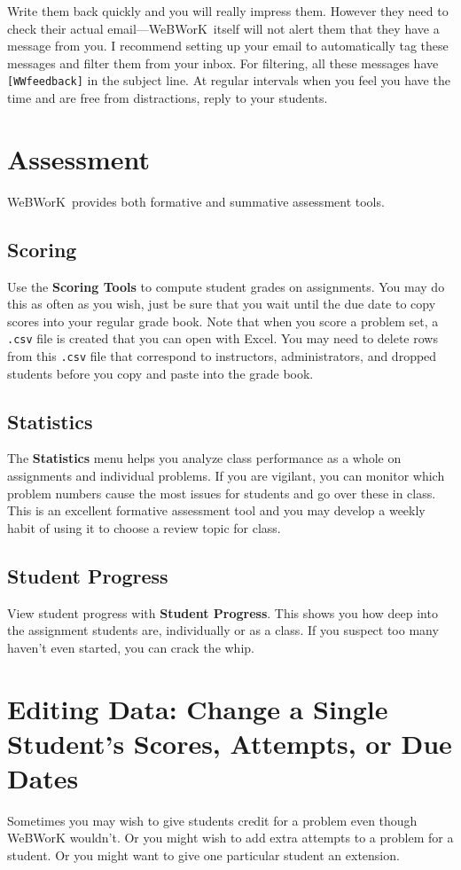 \documentclass[12pt]{article}
\newcommand{\menu}[1]{\textbf{#1}}
\newcommand{\WW}{WeBWorK}
\begin{document}
Write them back quickly and you will really impress them.
However they need to check their actual email---\WW\ itself will not alert them that they have a message from you.
I recommend setting up your email to automatically tag these messages and filter them from your inbox.
For filtering, all these messages have \texttt{[WWfeedback]} in the subject line.
At regular intervals when you feel you have the time and are free from distractions, reply to your students.

\section{Assessment}
\WW\ provides both formative and summative assessment tools.
\subsection{Scoring}
Use the \menu{Scoring Tools} to compute student grades on assignments.
You may do this as often as you wish, just be sure that you wait until the due date to copy scores into your regular grade book.
Note that when you score a problem set, a \texttt{.csv} file is created that you can open with Excel.
You may need to delete rows from this \texttt{.csv} file that correspond to instructors, administrators, and dropped students before you copy and paste into the grade book.

\subsection{Statistics}
The \menu{Statistics} menu helps you analyze class performance as a whole on assignments and individual problems.
If you are vigilant, you can monitor which problem numbers cause the most issues for students and go over these in class.
This is an excellent formative assessment tool and you may develop a weekly habit of using it to choose a review topic for class.

\subsection{Student Progress}
View student progress with \menu{Student Progress}.
This shows you how deep into the assignment students are, individually or as a class.
If you suspect too many haven't even started, you can crack the whip.

\section{Editing Data: Change a Single Student's Scores, Attempts, or Due Dates}
Sometimes you may wish to give students credit for a problem even though WeBWorK wouldn't.
Or you might wish to add extra attempts to a problem for a student.
Or you might want to give one particular student an extension.
\end{document}
